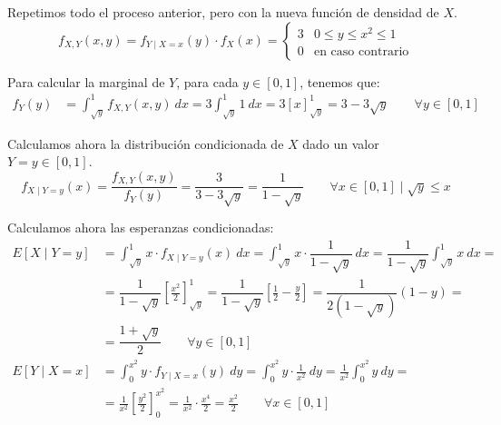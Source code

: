 \begin{ejercicio}
\begin{enumerate}
        Repetimos todo el proceso anterior, pero con la nueva función de densidad de $X$.
        \begin{equation*}
            f_{X,Y}(x,y) = f_{Y\mid X=x}(y)\cdot f_X(x) = \begin{cases}
                3 & 0\leq y\leq x^2\leq 1\\
                0 & \text{en caso contrario}
            \end{cases}
        \end{equation*}

        Para calcular la marginal de $Y$, para cada $y\in[0,1]$, tenemos que:
        \begin{align*}
            f_Y(y) &= \int_{\sqrt{y}}^{1} f_{X,Y}(x,y) \ dx
            = 3\int_{\sqrt{y}}^{1} 1 \ dx
            = 3\left[x\right]_{\sqrt{y}}^{1}
            =3-3\sqrt{y}\qquad \forall y\in[0,1]
        \end{align*}

        Calculamos ahora la distribución condicionada de $X$ dado un valor $Y = y\in [0,1]$.
        \begin{equation*}
            f_{X\mid Y=y}(x) = \dfrac{f_{X,Y}(x,y)}{f_Y(y)}
            = \dfrac{3}{3-3\sqrt{y}} = \dfrac{1}{1-\sqrt{y}}
            \qquad \forall x\in[0,1] \mid \sqrt{y}\leq x
        \end{equation*}

        Calculamos ahora las esperanzas condicionadas:
        \begin{align*}
            E[X\mid Y = y] &= \int_{\sqrt{y}}^{1} x\cdot f_{X\mid Y=y}(x) \ dx
            = \int_{\sqrt{y}}^{1} x\cdot \dfrac{1}{1-\sqrt{y}} \ dx
            = \dfrac{1}{1-\sqrt{y}}\int_{\sqrt{y}}^{1} x \ dx
            =\\&= \dfrac{1}{1-\sqrt{y}}\left[\frac{x^2}{2}\right]_{\sqrt{y}}^{1}
            = \dfrac{1}{1-\sqrt{y}}\left[\frac{1}{2} - \frac{y}{2}\right]
            = \dfrac{1}{2(1-\sqrt{y})}\left(1 - y\right)
            =\\&= \dfrac{1+\sqrt{y}}{2} \qquad\forall y\in[0,1]\\
            E[Y\mid X = x] &= \int_{0}^{x^2} y\cdot f_{Y\mid X=x}(y) \ dy
            = \int_{0}^{x^2} y\cdot \frac{1}{x^2} \ dy
            = \frac{1}{x^2}\int_{0}^{x^2} y \ dy
            =\\&= \frac{1}{x^2}\left[\frac{y^2}{2}\right]_{0}^{x^2}
            = \frac{1}{x^2}\cdot \frac{x^4}{2}
            = \frac{x^2}{2} \qquad \forall x\in[0,1]
        \end{align*}
    \end{enumerate}
\end{ejercicio}

